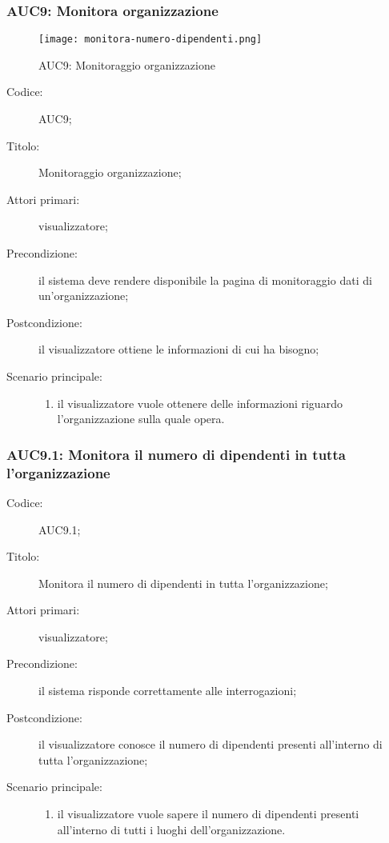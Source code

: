 \documentclass[../../../analisi-dei-requisiti.tex]{subfiles}
\begin{document}
\subsubsection{AUC9: Monitora organizzazione}%
\label{subs:AUC9}

\begin{figure}[H]
  \centering
  \texttt{[image: monitora-numero-dipendenti.png]}
  \caption{AUC9: Monitoraggio organizzazione}%
  \label{fig:AUC9}
\end{figure}

\begin{description}
  \item[Codice:] AUC9;
  \item[Titolo:] Monitoraggio organizzazione;
  \item[Attori primari:] visualizzatore;
  \item[Precondizione:] il sistema deve rendere disponibile la pagina di monitoraggio dati di un'organizzazione;
  \item[Postcondizione:] il visualizzatore ottiene le informazioni di cui ha bisogno;
  \item[Scenario principale:]
  \begin{enumerate}
    \item il visualizzatore vuole ottenere delle informazioni riguardo l'organizzazione sulla quale opera.
  \end{enumerate}
\end{description}

\subsubsection{AUC9.1: Monitora il numero di dipendenti in tutta l'organizzazione}%
\label{subs:AUC9.1}
\begin{description}
  \item[Codice:] AUC9.1;
  \item[Titolo:] Monitora il numero di dipendenti in tutta l'organizzazione;
  \item[Attori primari:] visualizzatore;
  \item[Precondizione:] il sistema risponde correttamente alle interrogazioni;
  \item[Postcondizione:] il visualizzatore conosce il numero di dipendenti presenti all'interno di tutta l'organizzazione;
  \item[Scenario principale:]
  \begin{enumerate}
    \item il visualizzatore vuole sapere il numero di dipendenti presenti all'interno di tutti i luoghi dell'organizzazione.
  \end{enumerate}
\end{description}
\end{document}
